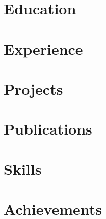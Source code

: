 \documentclass[letter,10pt]{article}
\def\website{web.njit.edu/$\sim$vg472}
\begin{document}
%

\section{Education}


\section{Experience}


\section{Projects}


\section{Publications}


\section{Skills}



\section{Achievements}



\createfootnote
\end{document}

